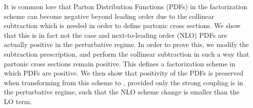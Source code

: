 It is common lore that Parton Distribution Functions (PDFs) in the \msbar{}
factorization scheme  can become negative beyond leading order due to the
collinear subtraction which is needed in order to define partonic cross
sections.
We show that this is in fact not the case and next-to-leading order (NLO)
\msbar{} PDFs are actually positive in the perturbative regime.
In order to prove this, we modify the subtraction prescription, and perform the
collinear subtraction in such a way that partonic cross sections remain
positive.
This defines  a factorization scheme in which PDFs are positive.
We then show that positivity of the PDFs is preserved when transforming from
this scheme to \msbar{}, provided only the strong coupling is in the
perturbative regime, such that the NLO scheme change is smaller than the LO
term.
